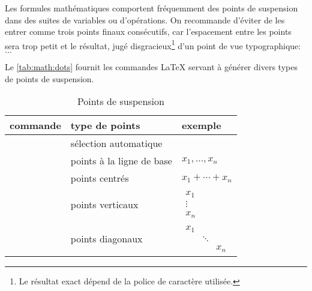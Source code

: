 Les formules mathématiques comportent fréquemment des points de
suspension dans des suites de variables ou d'opérations. On recommande
d'éviter de les entrer comme trois points finaux consécutifs, car
l'espacement entre les points sera trop petit et le résultat, jugé
disgracieux\footnote{%
  Le résultat exact dépend de la police de caractère utilisée.} %
d'un point de vue typographique: $...$

Le \autoref{tab:math:dots} fournit les commandes {\LaTeX} servant à
générer divers types de points de suspension.

\begin{table}
  \caption{Points de suspension}
  \label{tab:math:dots}
  \centering
  \begin{tabular}{lll}
    \toprule
    commande & type de points & exemple \\
    \midrule
    \cmd{\dots} &  sélection automatique \\
    \cmd{\ldots} & points à la ligne de base & $x_1, \ldots, x_n$ \\
    \cmd{\cdots} & points centrés & $x_1 + \cdots + x_n$ \\
    \addlinespace[6pt]
    \cmd{\vdots} & points verticaux & $
                                      \begin{matrix}
                                        x_1 \\ \vdots \\ x_n
                                      \end{matrix}$ \\
    \addlinespace[6pt]
    \cmd{\ddots} & points diagonaux & $
                                      \begin{matrix}
                                        x_1 &&\\ &\ddots& \\ && x_n
                                      \end{matrix}$ \\
    \bottomrule
  \end{tabular}
\end{table}

